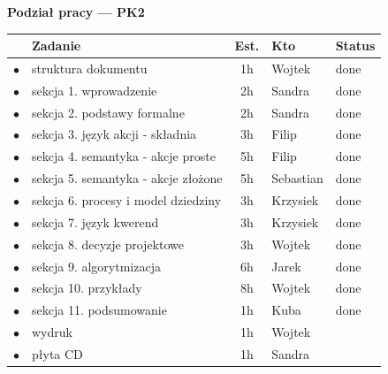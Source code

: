 \documentclass[11pt,a4paper]{article}
\newif\ifshowdrafts
\theoremstyle{definition}
\begin{document}
\sloppy

\ifshowdrafts
\thispagestyle{empty}
\color{todoorange}

\begin{center}
    {\LARGE\bfseries Podział pracy --- PK2}
\end{center}

\vspace{0.5cm}

\renewcommand{\arraystretch}{1.4}
\small
\begin{center}
\begin{tabular}{@{} c p{5.6cm} c p{2cm} p{1.8cm} @{}}
\toprule
 & \textbf{Zadanie} & \textbf{Est.} & \textbf{Kto} & \textbf{Status} \\
\midrule
$\bullet$ & struktura dokumentu                    & 1h & Wojtek & done \\
$\bullet$ & sekcja 1. wprowadzenie                & 2h & Sandra & done \\
$\bullet$ & sekcja 2. podstawy formalne           & 2h & Sandra & done\\
$\bullet$ & sekcja 3. język akcji - składnia    & 3h & Filip & done \\ 
$\bullet$ & sekcja 4. semantyka - akcje proste  & 5h & Filip & done \\ 
$\bullet$ & sekcja 5. semantyka - akcje złożone & 5h & Sebastian & done \\
$\bullet$ & sekcja 6. procesy i model dziedziny   & 3h & Krzysiek & done \\
$\bullet$ & sekcja 7. język kwerend               & 3h & Krzysiek & done \\
$\bullet$ & sekcja 8. decyzje projektowe          & 3h & Wojtek & done \\
$\bullet$ & sekcja 9. algorytmizacja              & 6h & Jarek & done \\
$\bullet$ & sekcja 10. przykłady                  & 8h & Wojtek &  done\\
$\bullet$ & sekcja 11. podsumowanie               & 1h & Kuba & done\\
$\bullet$ & wydruk                                        & 1h & Wojtek & \\
$\bullet$ & płyta CD                                      & 1h & Sandra & \\
\bottomrule
\end{tabular}
\end{center}
\normalsize
\end{document}
